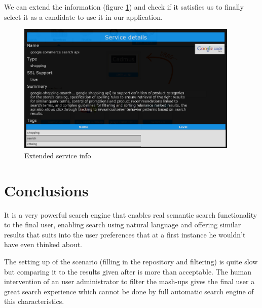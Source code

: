 We can extend the information (figure \ref{fig:extendedinfo}) and check if it satisfies us to finally select it as a candidate to use it in our application.

\begin{figure}[h]
	\centering
	\includegraphics[width=300pt]{graphics/extended-info.png}
	\caption{Extended service info}
	\label{fig:extendedinfo}
\end{figure}

\section{Conclusions}

It is a very powerful search engine that enables real semantic search functionality to the final user, enabling search using natural language and offering similar results that suits into the user preferences that at a first instance he wouldn't have even thinked about.

The setting up of the scenario (filling in the repository and filtering) is quite slow but comparing it to the results given after is more than acceptable. The human intervention of an user administrator to filter the mash-ups gives the final user a great search experience which cannot be done by full automatic search engine of this characteristics.

